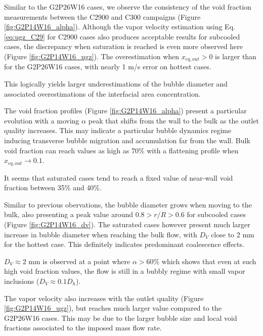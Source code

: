 Similar to the G2P26W16 cases, we observe the consistency of the void fraction measurements between the C2900 and C300 campaigns (Figure \ref{fig:G2P14W16_alpha}). Although the vapor velocity estimation using Eq. \ref{eq:ugz_C29} for C2900 cases also produces acceptable results for subcooled cases, the discrepancy when saturation is reached is even more observed here (Figure \ref{fig:G2P14W16_ugz}). The overestimation when $x_{eq,out}>0$ is larger than for the G2P26W16 cases, with nearly 1 m/s error on hottest cases. 

This logically yields larger underestimations of the bubble diameter and associated overestimations of the interfacial area concentration.

\npar

The void fraction profiles (Figure \ref{fig:G2P14W16_alpha}) present a particular evolution with a moving $\alpha$ peak that shifts from the wall to the bulk as the outlet quality increases. This may indicate a particular bubble dynamics regime inducing transverse bubble migration and accumulation far from the wall. Bulk void fraction can reach values as high as 70\% with a flattening profile when $x_{eq,out} \to 0.1$.

\begin{remark*}{}
It seems that saturated cases tend to reach a fixed value of near-wall void fraction between 35\% and 40\%.
\end{remark*}

\npar

Similar to previous obervations, the bubble diameter grows when moving to the bulk, also presenting a peak value around $0.8 > r/R > 0.6$ for subcooled cases (Figure \ref{fig:G2P14W16_dv}). The saturated cases however present much larger increase in bubble diameter when reaching the bulk flow, with $D_{V}$ close to 2 mm for the hottest case. This definitely indicates predominant coalescence effects.

\begin{remark*}{}
$D_{V}\approx 2$ mm is observed at a point where $\alpha >60\%$ which shows that even at such high void fraction values, the flow is still in a bubbly regime with small vapor inclusions ($D_{V} \approx 0.1 D_{h}$).
\end{remark*}

\npar

The vapor velocity also increases with the outlet quality (Figure \ref{fig:G2P14W16_ugz}), but reaches much larger value compared to the G2P26W16 cases. This may be due to the larger bubble size and local void fractions associated to the imposed mass flow rate.


